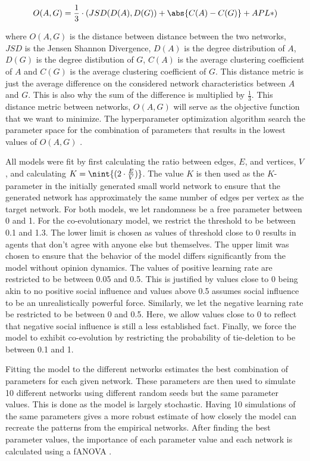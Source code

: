 \documentclass{article}
\DeclarePairedDelimiter{\nint}\lfloor\rceil
\DeclarePairedDelimiter{\abs}\lvert\rvert
\begin{document}
$$ O(A, G) = \frac{1}{3} \cdot \left(JSD(D(A), D(G)) + \abs{C(A) - C(G)} + APL*\right)$$

where $O(A, G)$ is the distance between distance between the two networks, $JSD$ is the Jensen Shannon Divergence, $D(A)$ is the degree distribution of $A$, $D(G)$ is the degree distibution of $G$, $C(A)$ is the average clustering coefficient of $A$ and $C(G)$ is the average clustering coefficient of $G$. This distance metric is just the average difference on the considered network characteristics between $A$ and $G$. This is also why the sum of the difference is multiplied by $\frac{1}{3}$. This distance metric between networks, $O(A, G)$ will serve as the objective function that we want to minimize. The hyperparameter optimization algorithm search the parameter space for the combination of parameters that results in the lowest values of $O(A, G)$ \cite{akiba_optuna_2019,wu_hyperparameter_2019}.

All models were fit by first calculating the ratio between edges, $E$, and vertices, $V$, and calculating $K = \nint{(2 \cdot \frac{E}{V})}$. The value $K$ is then used as the $K$-parameter in the initially generated small world network to ensure that the generated network has approximately the same number of edges per vertex as the target network. 
For both models, we let randomness be a free parameter between 0 and 1. For the co-evolutionary model, we restrict the threshold to be between 0.1 and 1.3. The lower limit is chosen as values of threshold close to 0 results in agents that don’t agree with anyone else but themselves. The upper limit was chosen to ensure that the behavior of the model differs significantly from the model without opinion dynamics. 
The values of positive learning rate are restricted to be between 0.05 and 0.5. This is justified by values close to 0 being akin to no positive social influence and values above 0.5 assumes social influence to be an unrealistically powerful force. Similarly, we let the negative learning rate be restricted to be between 0 and 0.5. Here, we allow values close to 0 to reflect that negative social influence is still a less established fact. Finally, we force the model to exhibit co-evolution by restricting the probability of tie-deletion to be between 0.1 and 1. 

Fitting the model to the different networks estimates the best combination of parameters for each given network. These parameters are then used to simulate 10 different networks using different random seeds but the same parameter values. This is done as the model is largely stochastic. Having 10 simulations of the same parameters gives a more robust estimate of how closely the model can recreate the patterns from the empirical networks.
After finding the best parameter values, the importance of each parameter value and each network is calculated using a fANOVA \cite{hutter_efficient_2014}. 
\end{document}
